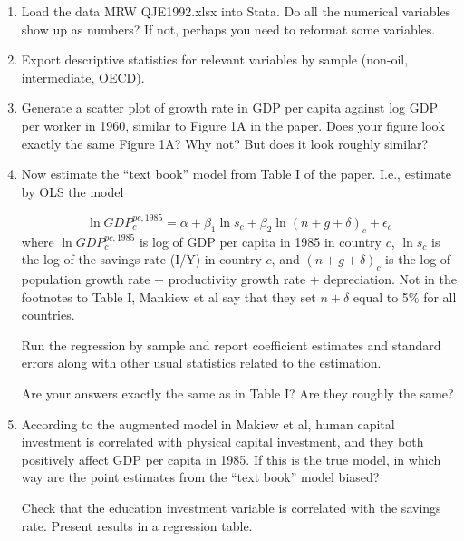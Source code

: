 \documentclass[11pt, a4paper]{article} %
\begin{document}
\begin{enumerate}
   
    \item Load the data MRW QJE1992.xlsx into Stata.  Do all the numerical variables show up as numbers?  If not, perhaps you need to reformat some variables.
    
    \bigskip
    
     \item Export descriptive statistics for relevant variables by sample (non-oil, intermediate, OECD).
        
    
\bigskip 

 \item Generate a scatter plot of growth rate in GDP per capita against log GDP per worker in 1960, similar to Figure 1A in the paper.  Does your figure look exactly the same Figure 1A?  Why not? But does it look roughly similar?
     
 


\item Now estimate the ``text book'' model from Table I of the paper.  I.e., estimate by OLS the model

\begin{equation*}
\ln GDP^{pc, 1985}_{c} = \alpha + \beta_1 \ln s_{c} + \beta_2 \ln \left(n + g + \delta \right)_{c} + \epsilon_{c}
\end{equation*}where $\ln GDP^{pc, 1985}_{c}$ is log of GDP per capita in 1985 in country $c$, $\ln s_{c}$ is the log of the savings rate (I/Y) in country $c$, and $\left(n + g + \delta \right)_{c}$ is the log of population growth rate + productivity growth rate + depreciation.  Not in the footnotes to Table I, Mankiew et al say that they set $n+\delta$ equal to 5\% for all countries.  

Run the regression by sample and report coefficient estimates and standard errors along with other usual statistics related to the estimation.
   
\bigskip

Are your answers exactly the same as in Table I?  Are they roughly the same?


\item According to the augmented model in Makiew et al, human capital investment is correlated with physical capital investment, and they both positively affect GDP per capita in 1985.  If this is the true model, in which way are the point estimates from the ``text book'' model biased?

Check that the education investment variable is correlated with the savings rate.  Present results in a regression table.
 

\end{enumerate}
\end{document}
